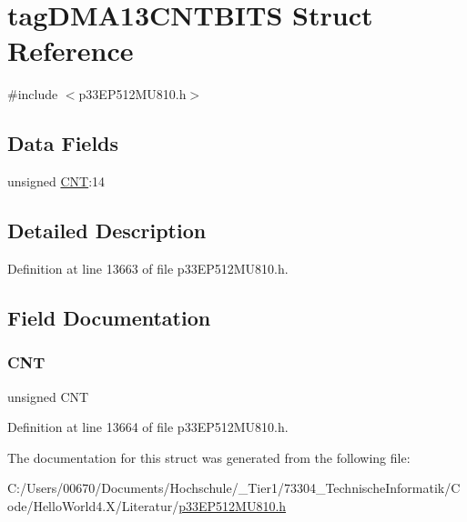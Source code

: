\hypertarget{structtag_d_m_a13_c_n_t_b_i_t_s}{}\section{tag\+D\+M\+A13\+C\+N\+T\+B\+I\+TS Struct Reference}
\label{structtag_d_m_a13_c_n_t_b_i_t_s}


{\ttfamily \#include $<$p33\+E\+P512\+M\+U810.\+h$>$}

\subsection*{Data Fields}
\begin{DoxyCompactItemize}
\item 
unsigned \hyperlink{structtag_d_m_a13_c_n_t_b_i_t_s_a30be39d82c244f19fd98dd74227487f6}{C\+NT}\+:14
\end{DoxyCompactItemize}


\subsection{Detailed Description}


Definition at line 13663 of file p33\+E\+P512\+M\+U810.\+h.



\subsection{Field Documentation}
\mbox{\label{structtag_d_m_a13_c_n_t_b_i_t_s_a30be39d82c244f19fd98dd74227487f6}} 
\subsubsection{\texorpdfstring{C\+NT}{CNT}}
{\footnotesize\ttfamily unsigned C\+NT}



Definition at line 13664 of file p33\+E\+P512\+M\+U810.\+h.



The documentation for this struct was generated from the following file\+:\begin{DoxyCompactItemize}
\item 
C\+:/\+Users/00670/\+Documents/\+Hochschule/\+\_\+\+Tier1/73304\+\_\+\+Technische\+Informatik/\+Code/\+Hello\+World4.\+X/\+Literatur/\hyperlink{p33_e_p512_m_u810_8h}{p33\+E\+P512\+M\+U810.\+h}\end{DoxyCompactItemize}
